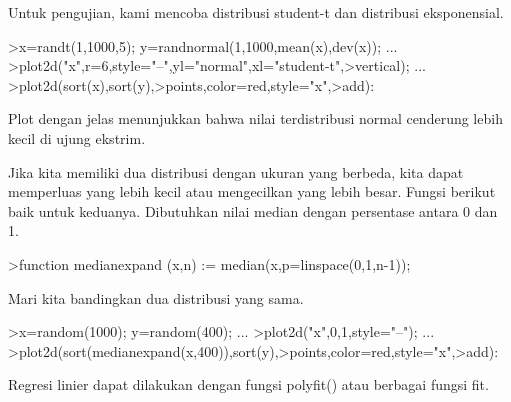 \documentclass{article}
\begin{document}
\begin{eulernotebook}
\begin{eulercomment}
\begin{eulercomment}
\begin{eulercomment}
Untuk pengujian, kami mencoba distribusi student-t dan distribusi
eksponensial.
\end{eulercomment}
\begin{eulerprompt}
>x=randt(1,1000,5); y=randnormal(1,1000,mean(x),dev(x)); ...
>plot2d("x",r=6,style="--",yl="normal",xl="student-t",>vertical); ...
>plot2d(sort(x),sort(y),>points,color=red,style="x",>add):
\end{eulerprompt}
\begin{eulercomment}
Plot dengan jelas menunjukkan bahwa nilai terdistribusi normal
cenderung lebih kecil di ujung ekstrim.

Jika kita memiliki dua distribusi dengan ukuran yang berbeda, kita
dapat memperluas yang lebih kecil atau mengecilkan yang lebih besar.
Fungsi berikut baik untuk keduanya. Dibutuhkan nilai median dengan
persentase antara 0 dan 1.
\end{eulercomment}
\begin{eulerprompt}
>function medianexpand (x,n) := median(x,p=linspace(0,1,n-1));
\end{eulerprompt}
\begin{eulercomment}
Mari kita bandingkan dua distribusi yang sama.
\end{eulercomment}
\begin{eulerprompt}
>x=random(1000); y=random(400); ...
>plot2d("x",0,1,style="--"); ...
>plot2d(sort(medianexpand(x,400)),sort(y),>points,color=red,style="x",>add):
\end{eulerprompt}
\begin{eulercomment}
Regresi linier dapat dilakukan dengan fungsi polyfit() atau berbagai
fungsi fit.


\end{eulercomment}
\end{eulercomment}
\end{eulercomment}
\end{eulernotebook}
\end{document}
